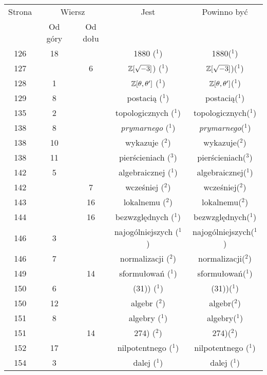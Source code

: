 \documentclass[a4paper,11pt]{article}
\numberwithin{equation}{section}
\begin{document}
\begin{center}
  \begin{tabular}{|c|c|c|c|c|}
    \hline
    Strona & \multicolumn{2}{c|}{Wiersz} & Jest
                              & Powinno być \\ \cline{2-3}
    & Od góry & Od dołu & & \\
    \hline
    126 & 18 & & 1880 ($^{ 1 }$) & 1880($^{ 1 }$) \\
    127 & &  6 & $\mathbb{Z}[ \sqrt{ -3 } ]$) ($^{ 1 }$)
           & $\mathbb{Z}[ \sqrt{ -3 } ]$)($^{ 1 }$) \\
    128 &  1 & & $\mathbb{Z}[ \theta, \theta' ]$ ($^{ 1 }$)
           & $\mathbb{Z}[ \theta, \theta' ]$($^{ 1 }$) \\
    129 &  8 & & postacią ($^{ 1 }$) & postacią($^{ 1 }$) \\
    135 &  2 & & topologicznych ($^{ 1 }$) & topologicznych($^{ 1 }$) \\
    138 &  8 & & \textit{prymarnego} ($^{ 1 }$)
           & \textit{prymarnego}($^{ 1 }$) \\
    138 & 10 & & wykazuje ($^{ 2 }$) & wykazuje($^{ 2 }$) \\
    138 & 11 & & pierścieniach ($^{ 3 }$) & pierścieniach($^{ 3 }$) \\
    142 &  5 & & algebraicznej ($^{ 1 }$) & algebraicznej($^{ 1 }$) \\
    142 & &  7 & wcześniej ($^{ 2 }$) & wcześniej($^{ 2 }$) \\
    143 & & 16 & lokalnemu ($^{ 2 }$) & lokalnemu($^{ 2 }$) \\
    144 & & 16 & bezwzględnych ($^{ 1 }$) & bezwzględnych($^{ 1 }$) \\
    146 &  3 & & najogólniejszych ($^{ 1 }$) & najogólniejszych($^{ 1 }$) \\
    146 &  7 & & normalizacji ($^{ 2 }$) & normalizacji($^{ 2 }$) \\
    149 & & 14 & sformułowań ($^{ 1 }$) & sformułowań($^{ 1 }$) \\
    150 &  6 & & (31)) ($^{ 1 }$) & (31))($^{ 1 }$) \\
    150 & 12 & & algebr ($^{ 2 }$) & algebr($^{ 2 }$) \\
    151 &  8 & & algebry ($^{ 1 }$) & algebry($^{ 1 }$) \\
    151 & & 14 & 274) ($^{ 2 }$) & 274)($^{ 2 }$) \\
    152 & 17 & & nilpotentnego ($^{ 1 }$) & nilpotentnego ($^{ 1 }$) \\
    154 &  3 & & dalej ($^{ 1 }$) & dalej ($^{ 1 }$) \\

\end{tabular}
\end{center}
\end{document}
